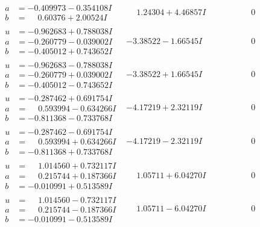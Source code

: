 \documentclass[1p]{elsarticle_modified}
\theoremstyle{definition}
\begin{document}
$$\begin{array}{c|c|c}
\begin{aligned}
a &= -0.409973 - 0.354108 I \\
b &= \phantom{-}0.60376 + 2.00524 I\end{aligned}
 & \phantom{-}1.24304 + 4.46857 I & \phantom{-0.000000 } 0 \\ \hline\begin{aligned}
u &= -0.962683 + 0.788038 I \\
a &= -0.260779 - 0.039002 I \\
b &= -0.405012 + 0.743652 I\end{aligned}
 & -3.38522 - 1.66545 I & \phantom{-0.000000 } 0 \\ \hline\begin{aligned}
u &= -0.962683 - 0.788038 I \\
a &= -0.260779 + 0.039002 I \\
b &= -0.405012 - 0.743652 I\end{aligned}
 & -3.38522 + 1.66545 I & \phantom{-0.000000 } 0 \\ \hline\begin{aligned}
u &= -0.287462 + 0.691754 I \\
a &= \phantom{-}0.593994 - 0.634266 I \\
b &= -0.811368 - 0.733768 I\end{aligned}
 & -4.17219 + 2.32119 I & \phantom{-0.000000 } 0 \\ \hline\begin{aligned}
u &= -0.287462 - 0.691754 I \\
a &= \phantom{-}0.593994 + 0.634266 I \\
b &= -0.811368 + 0.733768 I\end{aligned}
 & -4.17219 - 2.32119 I & \phantom{-0.000000 } 0 \\ \hline\begin{aligned}
u &= \phantom{-}1.014560 + 0.732117 I \\
a &= \phantom{-}0.215744 + 0.187366 I \\
b &= -0.010991 + 0.513589 I\end{aligned}
 & \phantom{-}1.05711 + 6.04270 I & \phantom{-0.000000 } 0 \\ \hline\begin{aligned}
u &= \phantom{-}1.014560 - 0.732117 I \\
a &= \phantom{-}0.215744 - 0.187366 I \\
b &= -0.010991 - 0.513589 I\end{aligned}
 & \phantom{-}1.05711 - 6.04270 I & \phantom{-0.000000 } 0\\

\end{array}$$
\end{document}
